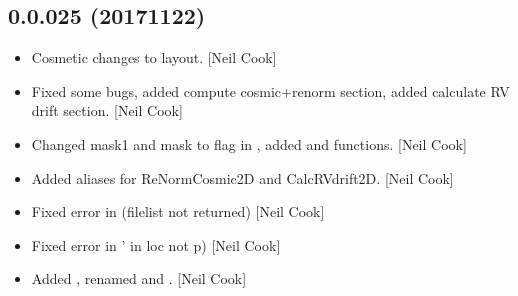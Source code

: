 \documentclass[a4paper,10pt,english]{report}
\begin{document}
\subsection{0.0.025 (2017\sphinxhyphen{}11\sphinxhyphen{}22)}
\label{\detokenize{misc/changelog:id546}}\begin{itemize}
\item {} 
Cosmetic changes to layout. {[}Neil Cook{]}

\item {} 
Fixed some bugs, added compute cosmic+renorm section, added calculate
RV drift section. {[}Neil Cook{]}

\item {} 
Changed mask1 and mask to flag in , added
 and  functions. {[}Neil Cook{]}

\item {} 
Added aliases for ReNormCosmic2D and CalcRVdrift2D. {[}Neil Cook{]}

\item {} 
Fixed error in  (filelist not returned) {[}Neil
Cook{]}

\item {} 
Fixed error in  ’ in loc
not p) {[}Neil Cook{]}

\item {} 
Added , renamed  and . {[}Neil
Cook{]}

\end{itemize}
\end{document}
